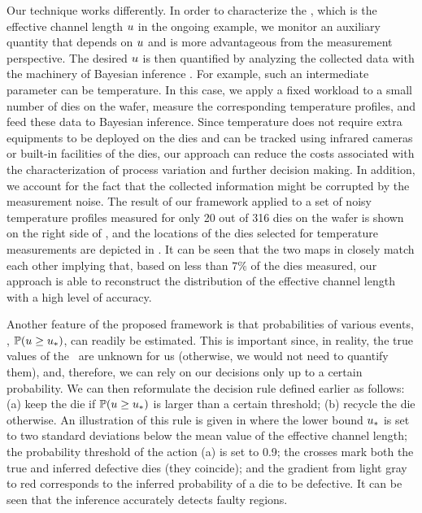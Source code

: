 Our technique works differently.
In order to characterize the \qoi, which is the effective channel length $u$ in the ongoing example, we monitor an auxiliary quantity that depends on $u$ and is more advantageous from the measurement perspective.
The desired $u$ is then quantified by analyzing the collected data with the machinery of Bayesian inference \cite{gelman2004}.
For example, such an intermediate parameter can be temperature.
In this case, we apply a fixed workload to a small number of dies on the wafer, measure the corresponding temperature profiles, and feed these data to Bayesian inference.
Since temperature does not require extra equipments to be deployed on the dies and can be tracked using infrared cameras \cite{mesa-martinez2007} or built-in facilities of the dies, our approach can reduce the costs associated with the characterization of process variation and further decision making.
In addition, we account for the fact that the collected information might be corrupted by the measurement noise.
The result of our framework applied to a set of noisy temperature profiles measured for only 20 out of 316 dies on the wafer is shown on the right side of , and the locations of the dies selected for temperature measurements are depicted in .
It can be seen that the two maps in  closely match each other implying that, based on less than $7\%$ of the dies measured, our approach is able to reconstruct the distribution of the effective channel length with a high level of accuracy.

Another feature of the proposed framework is that probabilities of various events, \eg, $\mathbb{P}(u \geq u_*)$, can readily be estimated.
This is important since, in reality, the true values of the \qoi\ are unknown for us (otherwise, we would not need to quantify them), and, therefore, we can rely on our decisions only up to a certain probability.
We can then reformulate the decision rule defined earlier as follows: (a) keep the die if $\mathbb{P}(u \geq u_*)$ is larger than a certain threshold; (b) recycle the die otherwise.
An illustration of this rule is given in  where the lower bound $u_*$ is set to two standard deviations below the mean value of the effective channel length; the probability threshold of the action (a) is set to 0.9; the crosses mark both the true and inferred defective dies (they coincide); and the gradient from light gray to red corresponds to the inferred probability of a die to be defective. It can be seen that the inference accurately detects faulty regions.


